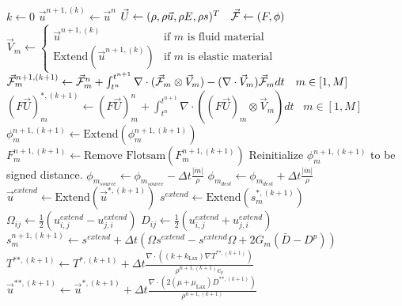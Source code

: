 \documentclass[]{article}
\begin{document}
\begin{algorithm}
\caption{Multiphase flows interacting with elastic 
	materials\label{asym_multiphase}}
\begin{algorithmic}[1] %
\State $k \gets 0$
\State $\vec{u}^{n+1,(k)} \gets \vec{u}^{n}$
\State $\vec{U}\gets (\rho,\rho\vec{u},\rho E,\rho s)^{T} \hspace{10pt} \vec{\cal F}\gets (F,\phi)$
\State $\vec{V}_{m}\gets\left\{ \begin{array}{cc} \vec{u}^{n+1,(k)} & \mbox{if $m$ is fluid material} \\ \mbox{Extend}(\vec{u}^{n+1,(k)}) & \mbox{if $m$ is elastic material} \end{array} \right.$
\State $\vec{\cal F}^{n+1,(k+1)}_{m}\gets \vec{\cal F}^{n}_{m}+\int_{t^{n}}^{t^{n+1}} \nabla\cdot(\vec{\cal F}_{m}\otimes\vec{V}_{m})-(\nabla\cdot\vec{V}_{m})\vec{\cal F}_{m} dt \hspace{10pt} m\in[1,M]$
\State $(F\vec{U})^{\ast,(k+1)}_{m}\gets (F\vec{U})^{n}_{m}+\int_{t^{n}}^{t^{n+1}}\nabla\cdot((F\vec{U})_{m}\otimes\vec{V}_{m})dt \hspace{10pt} m\in[1,M]$ 
 \State $\phi_{m}^{n+1,(k+1)}\gets\mbox{Extend}(\phi_{m}^{n+1,(k+1)})$ 
 \State $F_{m}^{n+1,(k+1)}\gets\mbox{Remove Flotsam}(F_{m}^{n+1,(k+1)})$
 \State Reinitialize $\phi_{m}^{n+1,(k+1)}$ to be signed distance.
 \State $\phi_{m_{source}}\gets\phi_{m_{source}}-\Delta t\frac{|\dot{m}|}{\rho}$
 \State $\phi_{m_{dest}}\gets\phi_{m_{dest}}+\Delta t\frac{|\dot{m}|}{\rho}$
 \State $\vec{u}^{extend}\gets \mbox{Extend}(\vec{u}^{\ast,(k+1)})$ 
 \State $s^{extend}\gets \mbox{Extend}(s_{m}^{\ast,(k+1)})$ 
 \State $\Omega_{ij}\gets \frac{1}{2}(u^{extend}_{i,j}-u^{extend}_{j,i})$
 \State $D_{ij}\gets \frac{1}{2}(u^{extend}_{i,j}+u^{extend}_{j,i})$
 \State $s_{m}^{n+1,(k+1)}\gets s^{extend}+\Delta t(\Omega s^{extend}-s^{extend}\Omega+2G_{m}(\bar{D}-D^{p}))$
 \EndFor
 \State $T^{\ast\ast,(k+1)}\gets T^{\ast,(k+1)}+\Delta t \frac{\nabla\cdot ((k+k_{\mbox{Lax}})\nabla T^{\ast\ast,(k+1)})}{\rho^{n+1,(k+1)}c_{v}}$
 \State $\vec{u}^{\ast\ast,(k+1)}\gets\vec{u}^{\ast,(k+1)}+\Delta t \frac{\nabla\cdot (2(\mu+\mu_{\mbox{Lax}})D^{\ast\ast,(k+1)})}{\rho^{n+1,(k+1)}}$

\end{algorithmic}
\end{algorithm}
\end{document}

